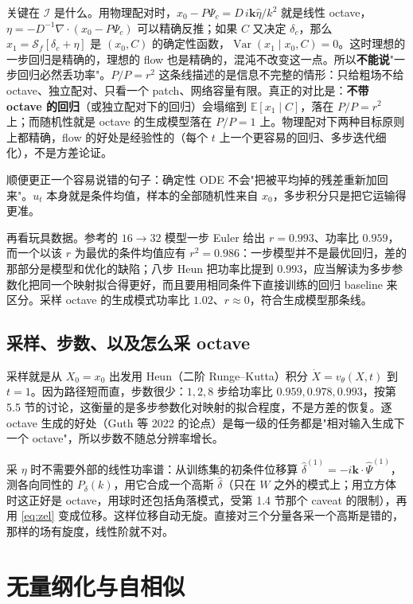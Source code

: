 \documentclass[11pt,UTF8,fontset=none]{ctexart}
\newcommand{\kk}{\mathbf{k}}
\newcommand{\E}{\mathbb{E}}
\newcommand{\Var}{\operatorname{Var}}
\newcommand{\Sim}{\mathcal S}
\begin{document}
关键在 $\mathcal I$ 是什么。用物理配对时，$x_0-P\Psi_c=D\,i\kk\hat\eta/k^2$ 就是线性 octave，$\eta=-D^{-1}\nabla\cdot(x_0-P\Psi_c)$ 可以精确反推；如果 $C$ 又决定 $\delta_c$，那么 $x_1=\Sim_f[\delta_c+\eta]$ 是 $(x_0,C)$ 的确定性函数，$\Var(x_1\mid x_0,C)=0$。这时理想的一步回归是精确的，理想的 flow 也是精确的，混沌不改变这一点。所以\textbf{不能说}"一步回归必然丢功率"。$P/P=r^2$ 这条线描述的是信息不完整的情形：只给粗场不给 octave、独立配对、只看一个 patch、网络容量有限。真正的对比是：\textbf{不带 octave 的回归}（或独立配对下的回归）会塌缩到 $\E[x_1\mid C]$，落在 $P/P=r^2$ 上；而随机性就是 octave 的生成模型落在 $P/P=1$ 上。物理配对下两种目标原则上都精确，flow 的好处是经验性的（每个 $t$ 上一个更容易的回归、多步迭代细化），不是方差论证。

顺便更正一个容易说错的句子：确定性 ODE 不会"把被平均掉的残差重新加回来"。$u_t$ 本身就是条件均值，样本的全部随机性来自 $x_0$，多步积分只是把它运输得更准。

再看玩具数据。参考的 $16\to32$ 模型一步 Euler 给出 $r=0.993$、功率比 $0.959$，而一个以该 $r$ 为最优的条件均值应有 $r^2=0.986$：一步模型并不是最优回归，差的那部分是模型和优化的缺陷；八步 Heun 把功率比提到 $0.993$，应当解读为多步参数化把同一个映射拟合得更好，而且要用相同条件下直接训练的回归 baseline 来区分。采样 octave 的生成模式功率比 $1.02$、$r\approx0$，符合生成模型那条线。

\subsection{采样、步数、以及怎么采 octave}

采样就是从 $X_0=x_0$ 出发用 Heun（二阶 Runge–Kutta）积分 $\dot X=v_\theta(X,t)$ 到 $t=1$。因为路径短而直，步数很少：$1,2,8$ 步给功率比 $0.959,0.978,0.993$，按第 5.5 节的讨论，这衡量的是多步参数化对映射的拟合程度，不是方差的恢复。逐 octave 生成的好处（Guth 等 2022 的论点）是每一级的任务都是"相对输入生成下一个 octave"，所以步数不随总分辨率增长。

采 $\eta$ 时不需要外部的线性功率谱：从训练集的初条件位移算 $\hat\delta^{(1)}=-i\kk\cdot\hat\Psi^{(1)}$，测各向同性的 $P_\delta(k)$，用它合成一个高斯 $\hat\delta$（只在 $W$ 之外的模式上；用立方体时这正好是 octave，用球时还包括角落模式，受第 1.4 节那个 caveat 的限制），再用 \eqref{eq:zel} 变成位移。这样位移自动无旋。直接对三个分量各采一个高斯是错的，那样的场有旋度，线性阶就不对。

\section{无量纲化与自相似}
\end{document}
